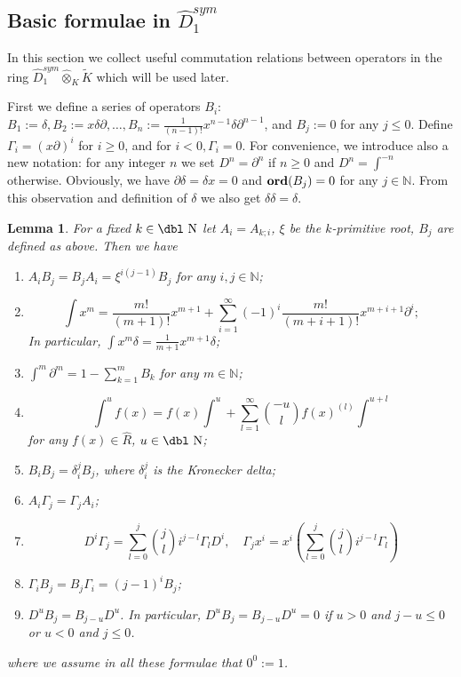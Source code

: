 \documentclass[11pt]{article}
\theoremstyle{definition}
\newcommand{\dn}{{\mbox{\dbl N}}}
\newcommand{\Ord}{\mathop {\rm \bf ord}}
\theoremstyle{plain}
\newtheorem{lemma}{Lemma}[section]
\numberwithin{equation}{section}
\begin{document}
\subsection{Basic  formulae in $\hat{D}_1^{sym}$}
\label{S:Basic  formulae in}

In this section we collect useful commutation relations between operators in the ring $\hat{D}_1^{sym}\hat{\otimes}_K\tilde{K}$ which will be used later. 

First we define a series of operators $B_i$:  $B_{1}:=\delta, B_{2}:=x\delta \partial ,\ldots, B_{n}:=\frac{1}{(n-1)!}x^{n-1}\delta \partial^{n-1}$, and  $B_j:=0$ for any $j\leq 0$. Define $\Gamma_i=(x\partial)^i$ for $i\ge 0$, and for $i<0, \Gamma_i=0$. For convenience, we introduce also a new notation: for any integer $n$ we set  $D^n=\partial^n$ if $n\ge 0$ and $D^n=\int^{-n}$  otherwise. Obviously, we have $\partial \delta=\delta x=0$ and $\Ord(B_{j})=0$ for any $j \in \mathbb{N}$.  From this observation and definition of $\delta$ we also get $\delta\delta=\delta$. 

\begin{lemma}
	\label{L:1}
	For a fixed $k\in \dn$ let $A_i=A_{k;i}$, $\xi$ be the $k$-primitive root, $B_j$ are defined as above. Then we have
	\begin{enumerate}
		\item $A_{i} B_{j}=B_{j} A_{i}=\xi^{i(j-1)}B_{j}$ for any $i,j \in \mathbb{N}$;
		\item 
	$$
\int x^m = \frac{m!}{(m+1)!}x^{m+1} + \sum_{i=1}^{\infty}(-1)^i \frac{m!}{(m+i+1)!}x^{m+i+1}\partial^i;
$$
	In particular, $\int x^m\delta = \frac{1}{m+1}x^{m+1}\delta$;
		\item $\int^{m} \partial^{m}=1-\sum_{k=1}^{m}B_{k}$ for any $m \in \mathbb{N}$;
		\item 
		$$\int^u f(x)=f(x)\int^u +
		\sum_{l=1}^{\infty}\binom{-u}{l}f(x)^{(l)}\int^{u+l}$$ for any  $f(x)\in \hat{R}$, $u\in\dn$;
		
		\item $B_i B_j=\delta_i^jB_j$, where $\delta_i^j$ is the Kronecker delta;
		
		\item $A_i\Gamma_j=\Gamma_jA_i$;
		\item $$
		D^i\Gamma_j=\sum_{l=0}^{j}\binom{j}{l}i^{j-l}\Gamma_lD^i, \quad \Gamma_jx^i=x^i(\sum_{l=0}^j\binom{j}{l}i^{j-l}\Gamma_l)
		$$
		\item $\Gamma_iB_j=B_j\Gamma_i=(j-1)^iB_j$;
		\item $D^u B_j=B_{j-u}D^u$. In particular, $D^u B_j=B_{j-u}D^u=0$ if $u>0$ and $j-u\le 0$ or $u<0$ and $j\le 0$.
	\end{enumerate}	
	where we assume in all these formulae that $0^0:=1$.
\end{lemma}
\end{document}
